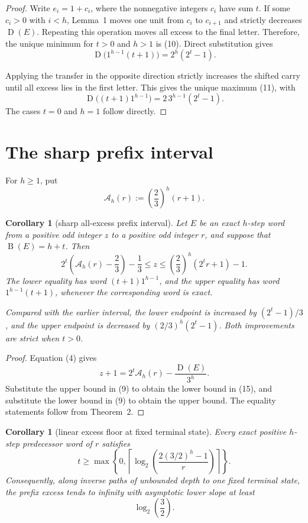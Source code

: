 \documentclass[11pt]{article}
\newtheorem{corollary}[theorem]{Corollary}
\newcommand{\mass}{\operatorname{B}}
\newcommand{\sh}{\operatorname{D}}
\begin{document}
\begin{proof}
Write $e_i=1+c_i$, where the nonnegative integers $c_i$ have sum $t$.
If some $c_i>0$ with $i<h$, Lemma~1 moves one unit from $c_i$ to
$c_{i+1}$ and strictly decreases $\sh(E)$.  Repeating this operation
moves all excess to the final letter.  Therefore, the unique minimum
for $t>0$ and $h>1$ is (10).  Direct substitution gives
\[
 \sh\bigl(1^{h-1}(t+1)\bigr)=2^h(2^t-1).
 \tag{12}
\]

Applying the transfer in the opposite direction strictly increases the
shifted carry until all excess lies in the first letter.  This gives the
unique maximum (11), with
\[
 \sh\bigl((t+1)1^{h-1}\bigr)
 =2\,3^{h-1}(2^t-1).
 \tag{13}
\]
The cases $t=0$ and $h=1$ follow directly.
\end{proof}

\section{The sharp prefix interval}

For $h\geq1$, put
\[
 \mathcal A_h(r):=\left(\frac23\right)^h(r+1).
 \tag{14}
\]

\begin{corollary}[sharp all-excess prefix interval]
Let $E$ be an exact $h$-step word from a positive odd integer $z$ to a
positive odd integer $r$, and suppose that $\mass(E)=h+t$.  Then
\[
 \boxed{
 2^t\left(\mathcal A_h(r)-\frac23\right)-\frac13
 \leq z
 \leq
 \left(\frac23\right)^h(2^t r+1)-1.}
 \tag{15}
\]
The lower equality has word $(t+1)1^{h-1}$, and the upper equality has
word $1^{h-1}(t+1)$, whenever the corresponding word is exact.

Compared with the earlier interval, the lower endpoint is increased by
$(2^t-1)/3$, and the upper endpoint is decreased by
$(2/3)^h(2^t-1)$.  Both improvements are strict when $t>0$.
\end{corollary}

\begin{proof}
Equation (4) gives
\[
 z+1=2^t\mathcal A_h(r)-\frac{\sh(E)}{3^h}.
 \tag{16}
\]
Substitute the upper bound in (9) to obtain the lower bound in (15),
and substitute the lower bound in (9) to obtain the upper bound.  The
equality statements follow from Theorem~2.
\end{proof}

\begin{corollary}[linear excess floor at fixed terminal state]
Every exact positive $h$-step predecessor word of $r$ satisfies
\[
 \boxed{
 t\geq
 \max\left\{0,
 \left\lceil
 \log_2\left(\frac{2(3/2)^h-1}{r}\right)
 \right\rceil\right\}.}
 \tag{17}
\]
Consequently, along inverse paths of unbounded depth to one fixed
terminal state, the prefix excess tends to infinity with asymptotic
lower slope at least
\[
 \log_2\left(\frac32\right).
 \tag{18}
\]
\end{corollary}
\end{document}
